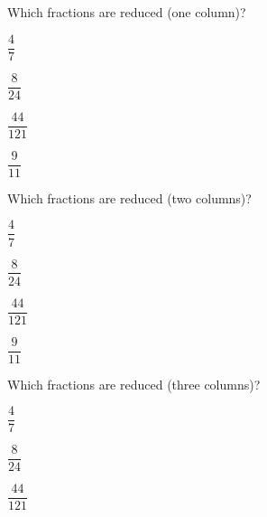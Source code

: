 \documentclass{article}
\newcommand{\choice}{\item}
\begin{document}
\noindent Which fractions are reduced (one column)?
\begin{choices}
	\choice $\dfrac{4}{7}$
	\choice $\dfrac{8}{24}$
	\choice $\dfrac{44}{121}$
	\choice $\dfrac{9}{11}$
\end{choices}

\noindent Which fractions are reduced (two columns)?
\begin{choices}[twocol]
	\choice $\dfrac{4}{7}$
	\choice $\dfrac{8}{24}$
	\choice $\dfrac{44}{121}$
	\choice $\dfrac{9}{11}$
\end{choices}

\noindent Which fractions are reduced (three columns)?
\begin{choices}[threecol]
	\choice $\dfrac{4}{7}$
	\choice $\dfrac{8}{24}$
	\choice $\dfrac{44}{121}$
\end{choices}
\end{document}
